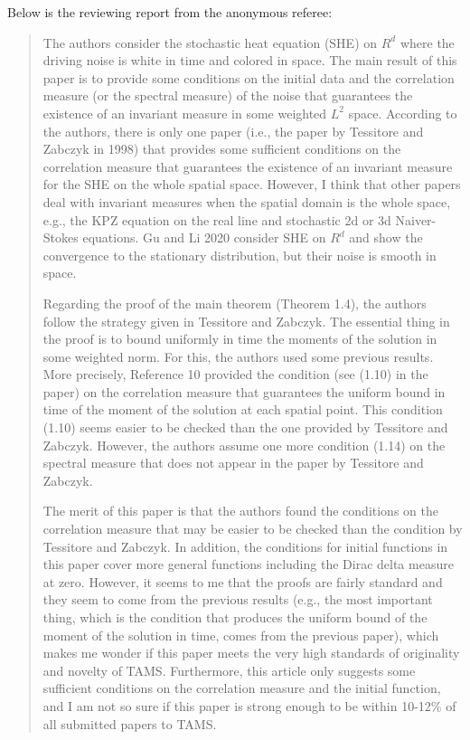 \documentclass[a4paper,12pt]{article}%
\theoremstyle{plain}
\theoremstyle{definition}
\numberwithin{equation}{section}
\begin{document}
\printbibliography[title = {References}]

\newpage
\begin{center}
  Below is the reviewing report from the anonymous referee:
\end{center}
\begin{quotation}
  \it  

  The authors consider the stochastic heat equation (SHE) on $R^d$ where the
  driving noise is white in time and colored in space. The main result of this
  paper is to provide some conditions on the initial data and the correlation
  measure (or the spectral measure) of the noise that guarantees the existence of
  an invariant measure in some weighted $L^2$ space. According to the authors,
  there is only one paper (i.e., the paper by Tessitore and Zabczyk in 1998) that
  provides some sufficient conditions on the correlation measure that guarantees
  the existence of an invariant measure for the SHE on the whole spatial space.
  However, I think that other papers deal with invariant measures when the spatial
  domain is the whole space, e.g., the KPZ equation on the real line and
  stochastic 2d or 3d Naiver-Stokes equations. Gu and Li 2020 consider SHE on
  $R^d$ and show the convergence to the stationary distribution, but their noise
  is smooth in space. 

  Regarding the proof of the main theorem (Theorem 1.4), the authors follow the
  strategy given in Tessitore and Zabczyk. The essential thing in the proof is to
  bound uniformly in time the moments of the solution in some weighted norm. For
  this, the authors used some previous results. More precisely, Reference 10
  provided the condition (see (1.10) in the paper) on the correlation measure that
  guarantees the uniform bound in time of the moment of the solution at each
  spatial point. This condition (1.10) seems easier to be checked than the one
  provided by Tessitore and Zabczyk. However, the authors assume one more
  condition (1.14) on the spectral measure that does not appear in the paper by
  Tessitore and Zabczyk.

  The merit of this paper is that the authors found the conditions on the
  correlation measure that may be easier to be checked than the condition by
  Tessitore and Zabczyk. In addition, the conditions for initial functions in this
  paper cover more general functions including the Dirac delta measure at zero.
  However, it seems to me that the proofs are fairly standard and they seem to
  come from the previous results (e.g., the most important thing, which is the
  condition that produces the uniform bound of the moment of the solution in time,
  comes from the previous paper), which makes me wonder if this paper meets the
  very high standards of originality and novelty of TAMS. Furthermore, this
  article only suggests some sufficient conditions on the correlation measure and
  the initial function, and I am not so sure if  this paper is strong enough to be
  within 10-12\% of all submitted papers to TAMS.

\end{quotation}
\end{document}
